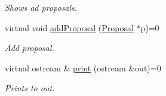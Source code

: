 \begin{DoxyCompactItemize}
\begin{DoxyCompactList}\small\item\em Shows ad proposals. \end{DoxyCompactList}\item 
virtual void \hyperlink{class_advertisement_aabe17c6fbc25e46d953e206ed408207a}{add\+Proposal} (\hyperlink{class_proposal}{Proposal} $\ast$p)=0
\begin{DoxyCompactList}\small\item\em Add proposal. \end{DoxyCompactList}\item 
virtual ostream \& \hyperlink{class_advertisement_adb38cc00b914dd7a0509829c220eb2bc}{print} (ostream \&out)=0
\begin{DoxyCompactList}\small\item\em Prints to out. \end{DoxyCompactList}\end{DoxyCompactItemize}
